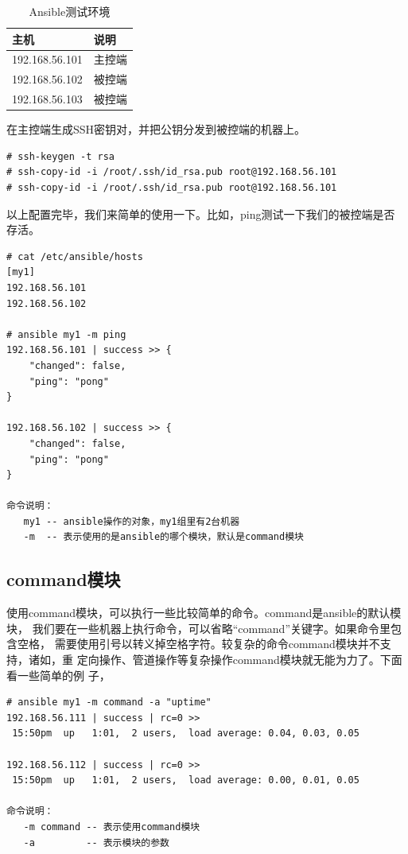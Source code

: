 \begin{table}[!ht]
  \centering
    \begin{tabular}{ll}
      \toprule
      主机           & 说明   \\
      \midrule
      192.168.56.101 & 主控端 \\
      192.168.56.102 & 被控端 \\
      192.168.56.103 & 被控端 \\
      \bottomrule
    \end{tabular}
    \caption{Ansible测试环境}
    \label{tab:AnsibleTestEnv}
\end{table}

在主控端生成SSH密钥对，并把公钥分发到被控端的机器上。
\begin{verbatim}
# ssh-keygen -t rsa
# ssh-copy-id -i /root/.ssh/id_rsa.pub root@192.168.56.101
# ssh-copy-id -i /root/.ssh/id_rsa.pub root@192.168.56.101
\end{verbatim}
以上配置完毕，我们来简单的使用一下。比如，ping测试一下我们的被控端是否
存活。
\begin{verbatim}
# cat /etc/ansible/hosts
[my1]
192.168.56.101
192.168.56.102

# ansible my1 -m ping 
192.168.56.101 | success >> {
    "changed": false, 
    "ping": "pong"
}

192.168.56.102 | success >> {
    "changed": false, 
    "ping": "pong"
}

命令说明：
   my1 -- ansible操作的对象，my1组里有2台机器
   -m  -- 表示使用的是ansible的哪个模块，默认是command模块
\end{verbatim}
\subsection{command模块}
\label{sec:AnsibleCommandMod}

使用command模块，可以执行一些比较简单的命令。command是ansible的默认模块，
我们要在一些机器上执行命令，可以省略“command”关键字。如果命令里包含空格，
需要使用引号以转义掉空格字符。较复杂的命令command模块并不支持，诸如，重
定向操作、管道操作等复杂操作command模块就无能为力了。下面看一些简单的例
子，
\begin{verbatim}
# ansible my1 -m command -a "uptime"
192.168.56.111 | success | rc=0 >>
 15:50pm  up   1:01,  2 users,  load average: 0.04, 0.03, 0.05

192.168.56.112 | success | rc=0 >>
 15:50pm  up   1:01,  2 users,  load average: 0.00, 0.01, 0.05

命令说明：
   -m command -- 表示使用command模块
   -a         -- 表示模块的参数
\end{verbatim}

